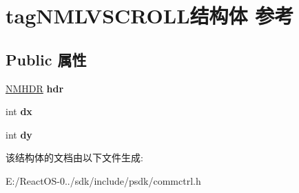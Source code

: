 \hypertarget{structtag_n_m_l_v_s_c_r_o_l_l}{}\section{tag\+N\+M\+L\+V\+S\+C\+R\+O\+L\+L结构体 参考}
\label{structtag_n_m_l_v_s_c_r_o_l_l}
\subsection*{Public 属性}
\begin{DoxyCompactItemize}
\item 
\mbox{\label{structtag_n_m_l_v_s_c_r_o_l_l_af8a68d64d8fca81c9ca48b17995cedb3}} 
\hyperlink{structtag_n_m_h_d_r}{N\+M\+H\+DR} {\bfseries hdr}
\item 
\mbox{\label{structtag_n_m_l_v_s_c_r_o_l_l_aa45b6efdaf2a1ba3817afdae5d688348}} 
int {\bfseries dx}
\item 
\mbox{\label{structtag_n_m_l_v_s_c_r_o_l_l_ae5e1970e15c9c5682654732a8e2fe806}} 
int {\bfseries dy}
\end{DoxyCompactItemize}


该结构体的文档由以下文件生成\+:\begin{DoxyCompactItemize}
\item 
E\+:/\+React\+O\+S-\/0../sdk/include/psdk/commctrl.\+h\end{DoxyCompactItemize}
